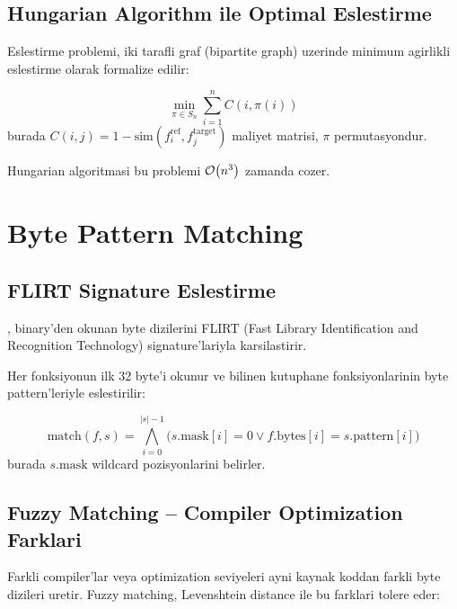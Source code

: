 \subsection{Hungarian Algorithm ile Optimal Eslestirme}

Eslestirme problemi, iki tarafli graf (bipartite graph) uzerinde
minimum agirlikli eslestirme olarak formalize edilir:

\begin{equation}
  \min_{\pi \in S_n} \sum_{i=1}^{n} C(i, \pi(i))
  \label{eq:hungarian}
\end{equation}
burada $C(i, j) = 1 - \text{sim}(f_i^{\text{ref}}, f_j^{\text{target}})$
maliyet matrisi, $\pi$ permutasyondur.

Hungarian algoritmasi bu problemi $\mathcal{O}\!\left(n^3\right)$ zamanda cozer.


\section{Byte Pattern Matching}
\label{sec:byte-pattern}

\subsection{FLIRT Signature Eslestirme}

, binary'den okunan byte dizilerini
FLIRT (Fast Library Identification and Recognition Technology)
signature'lariyla karsilastirir.

Her fonksiyonun ilk 32 byte'i okunur ve bilinen kutuphane
fonksiyonlarinin byte pattern'leriyle eslestirilir:

\begin{equation}
  \text{match}(f, s) = \bigwedge_{i=0}^{|s|-1}
    \bigl(s.\text{mask}[i] = 0 \lor f.\text{bytes}[i] = s.\text{pattern}[i]\bigr)
  \label{eq:masked-compare}
\end{equation}
burada $s.\text{mask}$ wildcard pozisyonlarini belirler.

\subsection{Fuzzy Matching -- Compiler Optimization Farklari}

Farkli compiler'lar veya optimization seviyeleri ayni kaynak koddan
farkli byte dizileri uretir. Fuzzy matching, Levenshtein distance
ile bu farklari tolere eder:

